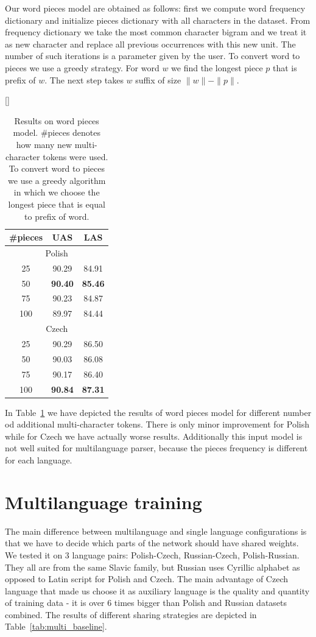 Our word pieces model are obtained as follows:
first we compute word frequency dictionary  and initialize pieces dictionary with all characters in the dataset.
From frequency dictionary we take the most common character bigram and we treat it as new character and replace all previous occurrences
with this new unit. The number of such iterations is a parameter given by the user.
To convert word to pieces we use a greedy strategy. For word $w$ we find the longest
piece $p$ that is prefix of $w$. The next step takes $w$ suffix of size $\|w\| - \|p\|$.

\begin{table}[!htbp]
    [\FBwidth]
    {\caption{Results on word pieces model. \#pieces denotes how many new
    multi-character tokens were used. To convert word to pieces we
    use a greedy algorithm in which we choose the longest piece that is equal
    to prefix of word.}
    \label{tab:word_pieces}}
{
    \begin{tabular}{c c c}
        \#pieces & UAS & LAS \\ \hline
        \multicolumn{3}{c}{Polish}\\
        25 & 90.29 &  84.91 \\
        50 & \textbf{90.40} &  \textbf{85.46}\\
        75 &  90.23 & 84.87\\
        100 & 89.97 & 84.44\\\hline
        \multicolumn{3}{c}{Czech}\\
        25 & 90.29 & 86.50\\
        50 & 90.03 & 86.08\\
        75 & 90.17 & 86.40\\
        100 & \textbf{90.84} & \textbf{87.31}
    \end{tabular}
}
\end{table}

In Table~\ref{tab:word_pieces} we have depicted the results of word pieces model
for different number od additional multi-character tokens. There is only minor
improvement for Polish while for Czech we have actually worse results. Additionally
this input model is not well suited for multilanguage parser, because the pieces
frequency is different for each language.

\section{Multilanguage training}
The main difference between multilanguage and single language configurations is
that we have to decide which parts of the network should have shared weights.
We tested it on 3 language pairs: Polish-Czech, Russian-Czech, Polish-Russian.
They all are from the same Slavic family, but Russian uses Cyrillic alphabet as
opposed to Latin script for Polish and Czech. The main advantage of Czech language
that made us choose it as auxiliary language is the quality and quantity of training data
- it is over 6 times bigger than Polish and Russian datasets combined.
The results of different sharing strategies are depicted in Table~\ref{tab:multi_baseline}.

